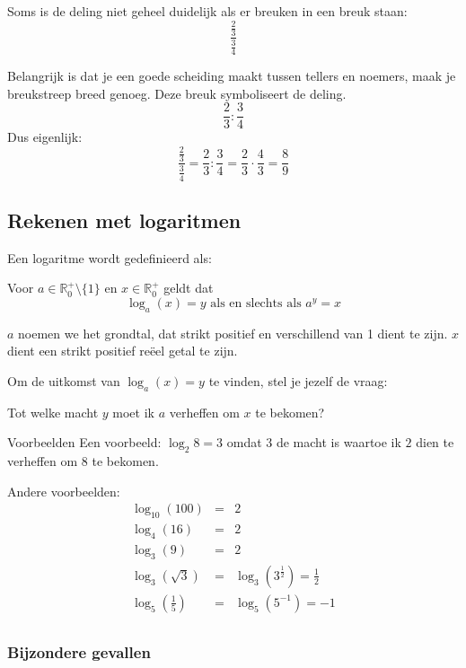 Soms is de deling niet geheel duidelijk als er breuken in een breuk staan:
\begin{equation*}
\frac{\frac{2}{3}}{\frac{3}{4}}
\end{equation*}

Belangrijk is dat je een goede scheiding maakt tussen tellers en noemers, maak je breukstreep breed genoeg. Deze breuk symboliseert de deling.
\begin{equation*}
\frac{2}{3}:\frac{3}{4}
\end{equation*}
Dus eigenlijk:
\begin{equation*}
\frac{\frac{2}{3}}{\frac{3}{4}}=\frac{2}{3}:\frac{3}{4}=\frac{2}{3} \cdot \frac{4}{3} = \frac{8}{9}
\end{equation*}

\subsection{Rekenen met logaritmen}
Een logaritme wordt gedefinieerd als:


\begin{definitie}
	Voor $a\in \mathbb{R}_0^+\setminus\{1\}$ en $x\in \mathbb{R}_0^+$ geldt dat
	\begin{equation*}
	\log_{a}(x) = y \text{ als en slechts als } a^y=x
	\end{equation*}
\end{definitie}

$a$ noemen we het grondtal, dat strikt positief en verschillend van 1 dient te zijn. $x$ dient een strikt positief re\"eel getal te zijn.

Om de uitkomst van $\log_{a}(x) = y$ te vinden, stel je jezelf de vraag:

Tot welke macht $y$ moet ik $a$ verheffen om $x$ te bekomen?

Voorbeelden
Een voorbeeld: $\log_{2}8=3$ omdat $3$ de macht is waartoe ik $2$ dien te verheffen om $8$ te bekomen.

Andere voorbeelden:
\begin{eqnarray*}
\log_{10}(100)&=&2 \\
\log_{4}(16)&=&2 \\
\log_{3}(9)&=&2 \\
\log_{3}(\sqrt{3})&=&\log_{3}(3^{\frac{1}{2}})=\frac{1}{2} \\
\log_{5}(\frac{1}{5})&=&\log_{5}(5^{-1})=-1 \\
\end{eqnarray*}

\subsubsection{Bijzondere gevallen}

